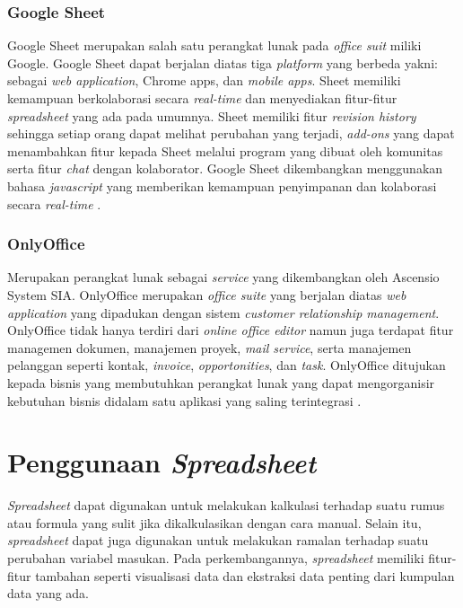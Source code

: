     \subsubsection{Google Sheet}
    Google Sheet merupakan salah satu perangkat lunak pada \textit{office suit} miliki Google. Google Sheet dapat berjalan diatas tiga \textit{platform} yang berbeda yakni: sebagai \textit{web application}, Chrome apps, dan \textit{mobile apps}. Sheet memiliki kemampuan berkolaborasi secara \textit{real-time} dan menyediakan fitur-fitur \textit{spreadsheet} yang ada pada umumnya. Sheet memiliki fitur \textit{revision history} sehingga setiap orang dapat melihat perubahan yang terjadi, \textit{add-ons} yang dapat menambahkan fitur kepada Sheet melalui program yang dibuat oleh komunitas serta fitur \textit{chat} dengan kolaborator. Google Sheet dikembangkan menggunakan bahasa \textit{javascript} yang memberikan kemampuan penyimpanan dan kolaborasi secara \textit{real-time} \parencite{GoogleSheet}.

    \subsubsection{OnlyOffice}
    Merupakan perangkat lunak sebagai \textit{service} yang dikembangkan oleh Ascensio System SIA. OnlyOffice merupakan \textit{office suite} yang berjalan diatas \textit{web application} yang dipadukan dengan sistem \textit{customer relationship management}. OnlyOffice tidak hanya terdiri dari \textit{online office editor} namun juga terdapat fitur managemen dokumen, manajemen proyek, \textit{mail service}, serta manajemen pelanggan seperti kontak, \textit{invoice}, \textit{opportonities}, dan \textit{task}. OnlyOffice ditujukan kepada bisnis yang membutuhkan perangkat lunak yang dapat mengorganisir kebutuhan bisnis didalam satu aplikasi yang saling terintegrasi \parencite{OnlyOffice}. 


\section{Penggunaan \textit{Spreadsheet}}
\textit{Spreadsheet} dapat digunakan untuk melakukan kalkulasi terhadap suatu rumus atau formula yang sulit jika dikalkulasikan dengan cara manual. Selain itu, \textit{spreadsheet} dapat juga digunakan untuk melakukan ramalan terhadap suatu perubahan variabel masukan. Pada perkembangannya, \textit{spreadsheet} memiliki fitur-fitur tambahan seperti visualisasi data dan ekstraksi data penting dari kumpulan data yang ada.

